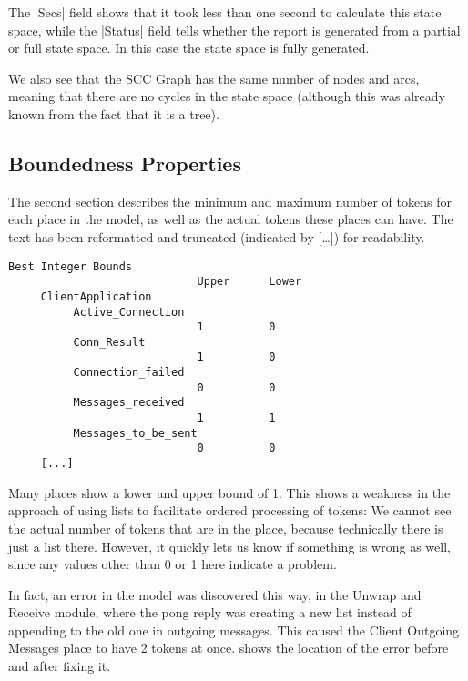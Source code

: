 	The |Secs| field shows that it took less than one second to calculate this
	state space, while the |Status| field tells whether the report is generated
	from a partial or full state space. In this case the state space is fully
	generated.
	
	We also see that the SCC Graph has the same number of nodes and arcs, meaning
	that there are no cycles in the state space (although this was already known
	from the fact that it is a tree).
	
	\subsection{Boundedness Properties}
	The second section describes the minimum and maximum number of tokens for
	each place in the model, as well as the actual tokens these places can have.
	The text has been reformatted and truncated (indicated by [\ldots]) for
	readability.
	\begin{lstlisting}[language={}]
  Best Integer Bounds
                             Upper      Lower
     ClientApplication
          Active_Connection
                             1          0
          Conn_Result
                             1          0
          Connection_failed
                             0          0
          Messages_received
                             1          1
          Messages_to_be_sent
                             0          0
     [...]

	\end{lstlisting}
	
	Many places show a lower and upper bound of 1. This shows a weakness
	in the approach of using lists to facilitate ordered processing of tokens: We
	cannot see the actual number of tokens that are in the place, because
	technically there is just a list there. However, it quickly lets us know if
	something is wrong as well, since any values other than 0 or 1 here indicate a
	problem. 
	
	In fact, an error in the model was discovered this way, in the Unwrap and
	Receive module, where the pong reply was creating a new list instead of
	appending to the old one in outgoing messages. This caused the Client Outgoing
	Messages place to have 2 tokens at once.  shows the location
	of the error before and after fixing it.
	
